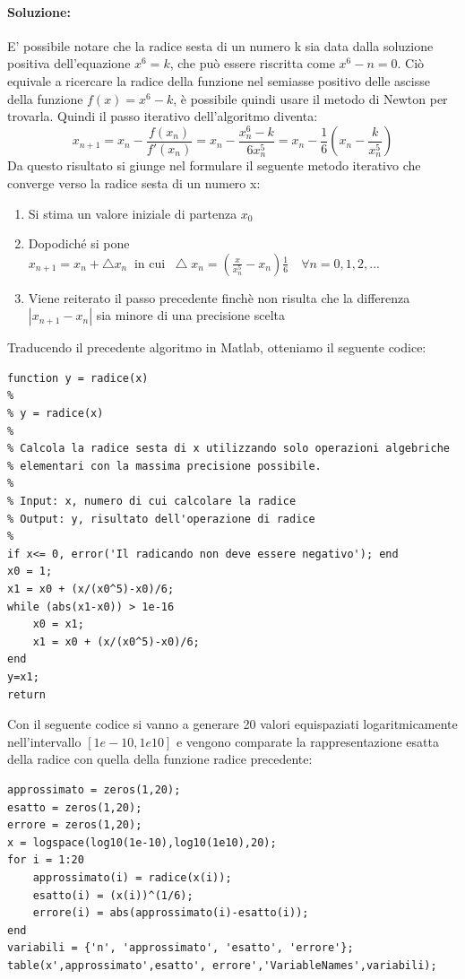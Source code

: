 \documentclass[12pt]{article}
\begin{document}
\paragraph{Soluzione:}
E' possibile notare che la radice sesta di un numero k sia data dalla soluzione positiva dell'equazione \( x^6 = k \), che può essere riscritta come \( x^6 - n= 0 \).
Ciò equivale a ricercare la radice della funzione nel semiasse positivo delle ascisse della funzione \(f(x)=x^6-k\), è possibile quindi usare il metodo di Newton per trovarla.
Quindi il passo iterativo dell'algoritmo diventa:
$$x_{n+1}=x_n - \frac{f(x_n)}{f'(x_n)} = x_n - \frac{x_n^6 - k}{6x_n^5} = x_n - \frac{1}{6}(x_n - \frac{k}{x_n^5})$$
Da questo risultato si giunge nel formulare il seguente metodo iterativo che converge verso la radice sesta di un numero x:
\begin{enumerate}
    \item Si stima un valore iniziale di partenza \(x_0\)
    \item Dopodiché si pone \(x_{n+1}=x_n + \bigtriangleup x_n\;\; \text{in cui}\;\; \bigtriangleup x_n = (\frac{x}{x^{5}_n}-x_n)\frac{1}{6} \quad \forall n=0,1,2,...\)
    \item Viene reiterato il passo precedente finchè non risulta che la differenza \(|x_{n+1}-x_n|\)  sia minore di una precisione scelta
\end{enumerate}
Traducendo il precedente algoritmo in Matlab, otteniamo il seguente codice:
\begin{lstlisting}[frame=single]
function y = radice(x)
% 
% y = radice(x)
% 
% Calcola la radice sesta di x utilizzando solo operazioni algebriche
% elementari con la massima precisione possibile.
% 
% Input: x, numero di cui calcolare la radice
% Output: y, risultato dell'operazione di radice
%
if x<= 0, error('Il radicando non deve essere negativo'); end
x0 = 1;
x1 = x0 + (x/(x0^5)-x0)/6;
while (abs(x1-x0)) > 1e-16
    x0 = x1;
    x1 = x0 + (x/(x0^5)-x0)/6;
end
y=x1;
return
\end{lstlisting}
Con il seguente codice si vanno a generare 20 valori equispaziati logaritmicamente nell'intervallo \([1e-10,1e10]\) e vengono comparate la rappresentazione esatta della radice con
quella della funzione radice precedente:
\begin{lstlisting}[frame=single]
approssimato = zeros(1,20);
esatto = zeros(1,20);
errore = zeros(1,20);
x = logspace(log10(1e-10),log10(1e10),20);
for i = 1:20
    approssimato(i) = radice(x(i));
    esatto(i) = (x(i))^(1/6);
    errore(i) = abs(approssimato(i)-esatto(i));
end
variabili = {'n', 'approssimato', 'esatto', 'errore'};
table(x',approssimato',esatto', errore','VariableNames',variabili);  
\end{lstlisting}
\end{document}
